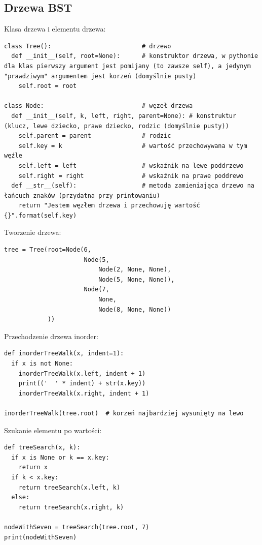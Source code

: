 \documentclass[10pt, oneside]{article}
\theoremstyle{remark}
\begin{document}
\subsection{Drzewa BST}
Klasa drzewa i elementu drzewa:
\begin{verbatim}
class Tree():                         # drzewo
  def __init__(self, root=None):      # konstruktor drzewa, w pythonie dla klas pierwszy argument jest pomijany (to zawsze self), a jedynym "prawdziwym" argumentem jest korzeń (domyślnie pusty)
    self.root = root                  

class Node:                           # węzeł drzewa
  def __init__(self, k, left, right, parent=None): # konstruktur (klucz, lewe dziecko, prawe dziecko, rodzic (domyślnie pusty))
    self.parent = parent              # rodzic 
    self.key = k                      # wartość przechowywana w tym węźle
    self.left = left                  # wskaźnik na lewe poddrzewo
    self.right = right                # wskaźnik na prawe poddrewo
  def __str__(self):                  # metoda zamieniająca drzewo na łańcuch znaków (przydatna przy printowaniu)
    return "Jestem węzłem drzewa i przechowuję wartość {}".format(self.key)
\end{verbatim}
Tworzenie drzewa:
\begin{verbatim}
tree = Tree(root=Node(6, 
                      Node(5, 
                          Node(2, None, None), 
                          Node(5, None, None)), 
                      Node(7, 
                          None, 
                          Node(8, None, None))
            ))
\end{verbatim}
Przechodzenie drzewa inorder:
\begin{verbatim}
def inorderTreeWalk(x, indent=1):
  if x is not None:
    inorderTreeWalk(x.left, indent + 1)
    print(('  ' * indent) + str(x.key))
    inorderTreeWalk(x.right, indent + 1)
    
inorderTreeWalk(tree.root)  # korzeń najbardziej wysunięty na lewo
\end{verbatim}
Szukanie elementu po wartości:
\begin{verbatim}
def treeSearch(x, k):
  if x is None or k == x.key:
    return x
  if k < x.key:
    return treeSearch(x.left, k)
  else:
    return treeSearch(x.right, k)
    
nodeWithSeven = treeSearch(tree.root, 7)
print(nodeWithSeven)
\end{verbatim}

\begin{verbatim}
	
\end{verbatim}
\end{document}
